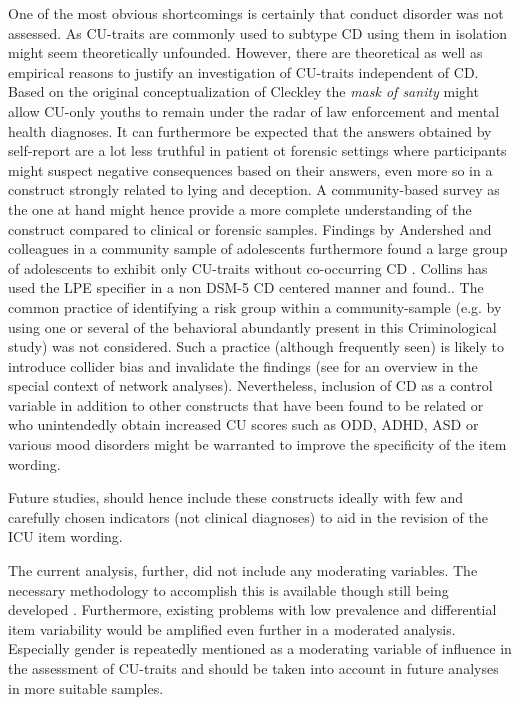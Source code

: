  One of the most obvious shortcomings is certainly that conduct disorder was not assessed.
 As CU-traits are commonly used to subtype CD using them in isolation might seem theoretically unfounded.
 However, there are theoretical as well as empirical reasons to justify an investigation of CU-traits independent of CD.
 Based on the original conceptualization of Cleckley the \textit{mask of sanity} might allow CU-only youths to remain under the radar of law enforcement
 and mental health diagnoses. 
 It can furthermore be expected that the answers obtained by self-report are a lot less truthful in patient ot forensic settings where participants might suspect negative consequences based on their answers,
 even more so in a construct strongly related to lying and deception.
 A community-based survey as the one at hand might hence provide a more complete understanding of the construct
 compared to clinical or forensic samples. Findings by Andershed and colleagues in a community sample of adolescents furthermore found 
 a large group of adolescents to exhibit only CU-traits without co-occurring CD \parencite{andershed_callous-unemotional_2018}.
 Collins \parencite{colins_clinical_2016} has used the LPE specifier in a non DSM-5 CD centered manner and found..
The common practice of identifying a risk group within a community-sample (e.g. by using one or several of the behavioral abundantly present in this Criminological study)
was not considered. Such a practice (although frequently seen) is likely to introduce collider bias and invalidate the findings (see  for an overview in the special context of network analyses).
Nevertheless, inclusion of CD as a control variable in addition to other constructs that have been found to be related or who 
unintendedly obtain increased CU scores such as ODD, ADHD, ASD or various mood disorders might be warranted to improve the specificity of the item wording. 

Future studies, should hence include these constructs ideally with few and carefully chosen indicators (not clinical diagnoses) to aid in the revision of the ICU item wording.

The current analysis, further,  did not include any moderating variables. 
The necessary methodology to accomplish this is available though still being developed \parencite{haslbeck_moderated_2019}.
Furthermore, existing problems with low prevalence and differential item variability would be amplified even further in a moderated analysis.  
Especially gender is repeatedly mentioned as a moderating variable of influence in the assessment of CU-traits \parencite{cardinale_reliability_2017} and should be taken into account in future analyses in more suitable samples.
     

